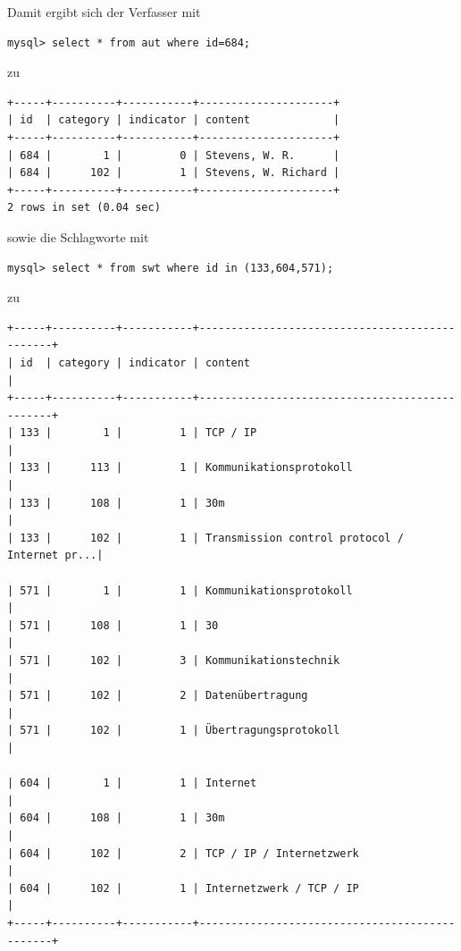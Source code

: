\documentclass[11pt, twoside, a4paper, BCOR8mm, DIV12, bibtotoc,idxtotoc]{scrbook}
\begin{document}
Damit ergibt sich der Verfasser mit

\begin{verbatim}
mysql> select * from aut where id=684;
\end{verbatim}

zu 

\begin{verbatim}
+-----+----------+-----------+---------------------+
| id  | category | indicator | content             |
+-----+----------+-----------+---------------------+
| 684 |        1 |         0 | Stevens, W. R.      |
| 684 |      102 |         1 | Stevens, W. Richard |
+-----+----------+-----------+---------------------+
2 rows in set (0.04 sec)
\end{verbatim}

sowie die Schlagworte mit 

\begin{verbatim}
mysql> select * from swt where id in (133,604,571);
\end{verbatim}
zu

\begin{verbatim}
+-----+----------+-----------+-----------------------------------------------+
| id  | category | indicator | content                                       |
+-----+----------+-----------+-----------------------------------------------+
| 133 |        1 |         1 | TCP / IP                                      |
| 133 |      113 |         1 | Kommunikationsprotokoll                       |
| 133 |      108 |         1 | 30m                                           |
| 133 |      102 |         1 | Transmission control protocol / Internet pr...|

| 571 |        1 |         1 | Kommunikationsprotokoll                       |
| 571 |      108 |         1 | 30                                            |
| 571 |      102 |         3 | Kommunikationstechnik                         |
| 571 |      102 |         2 | Datenübertragung                              |
| 571 |      102 |         1 | Übertragungsprotokoll                         |

| 604 |        1 |         1 | Internet                                      |
| 604 |      108 |         1 | 30m                                           |
| 604 |      102 |         2 | TCP / IP / Internetzwerk                      |
| 604 |      102 |         1 | Internetzwerk / TCP / IP                      |
+-----+----------+-----------+-----------------------------------------------+
\end{verbatim}
\end{document}
